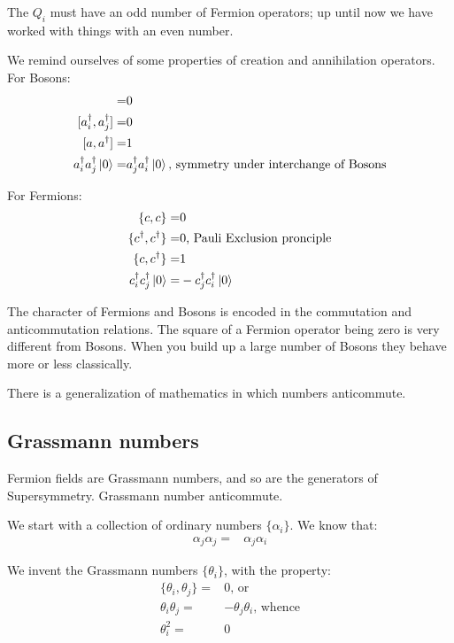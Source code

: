 \documentclass[]{article}
\begin{document}
The $Q_i$ must have an odd number of Fermion operators; up until now we have worked with things with an even number.

We remind ourselves of some properties of creation and annihilation operators. For Bosons:
\begin{align*}
	[a_i,a_j] =& 0\\
	[a_i^\dagger,a_j^\dagger]=&0\\
	[a,a^\dagger] =& 1\\
	a_i^\dagger a_j^\dagger \ket{0} =& a_j^\dagger a_i^\dagger \ket{0} \text{, symmetry under interchange of Bosons}
\end{align*}

For Fermions:
\begin{align*}
	\{c,c\}=& 0\\
	\{c^\dagger, c^\dagger \}=&0 \text{, Pauli Exclusion pronciple}\\
	\{c, c^\dagger \}=&1\\
	c_i^\dagger c_j^\dagger \ket{0} =& -c_j^\dagger c_i^\dagger \ket{0} 
\end{align*}

The character of Fermions and Bosons is encoded in the commutation and anticommutation relations. The square of a Fermion operator being zero is very different from Bosons. When you build up a large number of Bosons they behave more or less classically. 

There is a generalization of mathematics in which numbers anticommute.



\subsection{Grassmann numbers}

Fermion fields are Grassmann numbers, and so are the generators of Supersymmetry. Grassmann number anticommute.

We start with a collection of ordinary numbers $\{\alpha_i\}$. We know that:
\begin{align*}
	\alpha_j \alpha_j =& \alpha_j \alpha_i
\end{align*}

We invent the Grassmann numbers $\{ \theta_i\}$, with the property:
\begin{align*}
	\{\theta_i,\theta_j\} =& 0 \text{, or}\\
	\theta_i \theta_j =& - \theta_j \theta_i \text{, whence}\\
	\theta_i^2 =& 0
\end{align*}
\end{document}
